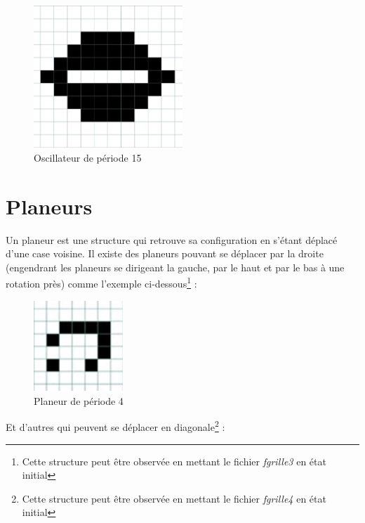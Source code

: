 \documentclass[12,french]{report}
\begin{document}
\begin{figure}[H]
	\center
	\includegraphics[width=0.5\textwidth]{./Images/13}
	\caption{Oscillateur de période 15}
\end{figure}\vspace{0.1cm}

\section{Planeurs}

Un planeur est une structure qui retrouve sa configuration en s'étant déplacé d'une case voisine. Il existe des planeurs pouvant se déplacer par la droite (engendrant les planeurs se dirigeant la gauche, par le haut et par le bas à une rotation près) comme l'exemple ci-dessous\footnote{Cette structure peut être observée en mettant le fichier \textit{fgrille3} en état initial} : \vspace{0.3cm}

\begin{figure}[H]
	\center
	\includegraphics[width=0.3\textwidth]{./Images/14}
	\caption{Planeur de période 4}
\end{figure}\vspace{0.5cm}

Et d'autres qui peuvent se déplacer en diagonale\footnote{Cette structure peut être observée en mettant le fichier \textit{fgrille4} en état initial} : \vspace{0.3cm}
\end{document}
